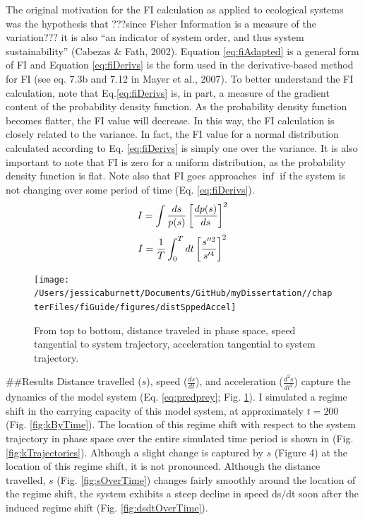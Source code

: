 \documentclass[12pt,twoside,openany]{reedthesis}
\begin{document}
The original motivation for the FI calculation as applied to ecological systems was the hypothesis that ???since Fisher Information is a measure of the variation??? it is also ``an indicator of system order, and thus system sustainability'' (Cabezas \& Fath, 2002). Equation \eqref{eq:fiAdapted} is a general form of FI and Equation \eqref{eq:fiDerivs} is the form used in the derivative-based method for FI (see eq. 7.3b and 7.12 in Mayer et al., 2007). To better understand the FI calculation, note that Eq.\eqref{eq:fiDerivs} is, in part, a measure of the gradient content of the probability density function. As the probability density function becomes flatter, the FI value will decrease. In this way, the FI calculation is closely related to the variance. In fact, the FI value for a normal distribution calculated according to Eq. \eqref{eq:fiDerivs} is simply one over the variance. It is also important to note that FI is zero for a uniform distribution, as the probability density function is flat. Note also that FI goes approaches \(\inf\) if the system is not changing over some period of time (Eq. \eqref{eq:fiDerivs}).
\begin{equation} 
    I = \int \frac{ds}{p(s)}\left[\frac{dp(s)}{ds}\right]^2  \\
    \label{eq:fiAdapted}
\end{equation}
\begin{equation}
    I=\frac{1}{T}\int_0^Tdt\left[\frac{s''^2}{s'^4}\right]^2 \\
  \label{eq:fiDerivs}
\end{equation}
\begin{figure}
\texttt{[image: /Users/jessicaburnett/Documents/GitHub/myDissertation//chapterFiles/fiGuide/figures/distSppedAccel]} \caption{From top to bottom, distance traveled in phase space, speed tangential to system trajectory, acceleration tangential to system trajectory.}\label{fig:distSpeedAccel}
\end{figure}
\#\#Results
Distance travelled (\(s\)), speed (\(\frac{ds}{dt}\)), and acceleration (\(\frac{d^2 s}{dt^2}\)) capture the dynamics of the model system (Eq. \eqref{eq:predprey}; Fig. \ref{fig:distSpeedAccel}). I simulated a regime shift in the carrying capacity of this model system, at approximately \(t=200\) (Fig. \ref{fig:kByTime}). The location of this regime shift with respect to the system trajectory in phase space over the entire simulated time period is shown in (Fig. \ref{fig:kTrajectories}). Although a slight change is captured by \(s\) (Figure 4) at the location of this regime shift, it is not pronounced. Although the distance travelled, \(s\) (Fig. \ref{fig:sOverTime}) changes fairly smoothly around the location of the regime shift, the system exhibits a steep decline in speed ds/dt soon after the induced regime shift (Fig. \ref{fig:dsdtOverTime}).
\end{document}
